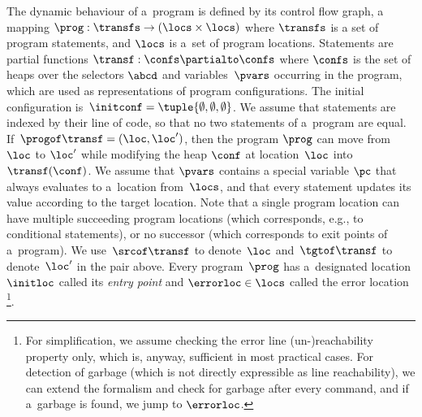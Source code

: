 {The dynamic behaviour of a~program is defined by its control flow graph,
a mapping $\prog: \transfs \to (\locs \times \locs)$ where $\transfs$ is a set of
program statements, and $\locs$ is a~set of program locations.
Statements are partial functions $\transf:\confs\partialto\confs$ where
$\confs$ is the set of heaps over the selectors $\abcd$ and variables~$\pvars$
occurring in the program, which are used as representations of program configurations.
The initial configuration is~$\initconf = \tuple{\emptyset,\emptyset,\emptyset}$.
%
%
%
We assume that statements are indexed by their line of code, so that no two
statements of a~program are equal.
%
If~$\progof \transf = (\loc, \loc')$,
then the program $\prog$ can move from $\loc$ to $\loc'$ while modifying 
the heap $\conf$ at location~$\loc$ into~$\transf(\conf)$. 
%
We assume that $\pvars$ contains a special variable $\pc$ that always evaluates
to a~location from~$\locs$, and that every statement updates its value
according to the target location.
%
%
%
Note that a single program location can have multiple succeeding program
locations (which corresponds, e.g., to conditional statements), or no successor
(which corresponds to exit points of a~program).
%
We use~$\srcof \transf$ to denote~$\loc$ and~$\tgtof \transf$ to
denote~$\loc'$ in the pair above.
Every program~$\prog$ has a~designated location $\initloc$ called its
\emph{entry point}
and $\errorloc\in\locs$ called the error location%
\footnote{
For simplification, we assume checking the error line (un-)reachability property
only,
which is, anyway, sufficient in most practical cases.
For detection of garbage (which is not directly expressible as line
reachability), we can extend the formalism and check for garbage after every
command, and if a~garbage is found, we jump to $\errorloc$.
}.


}
